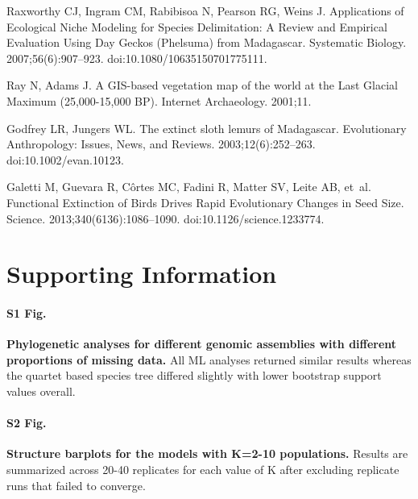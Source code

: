 \documentclass[10pt,letterpaper]{article}
\begin{document}
\begin{thebibliography}{10}
  Raxworthy CJ, Ingram CM, Rabibisoa N, Pearson RG, Weins J.
  \newblock Applications of {Ecological} {Niche} {Modeling} for {Species}
  {Delimitation}: {A} {Review} and {Empirical} {Evaluation} {Using} {Day}
  {Geckos} ({Phelsuma}) from {Madagascar}.
  \newblock Systematic Biology. 2007;56(6):907--923.
  \newblock doi:{10.1080/10635150701775111}.
  

  Ray N, Adams J.
  \newblock A {GIS}-based vegetation map of the world at the {Last} {Glacial} {Maximum} (25,000-15,000 {BP}).
  \newblock Internet Archaeology. 2001;11.

  Godfrey LR, Jungers WL.
  \newblock The extinct sloth lemurs of {Madagascar}.
  \newblock Evolutionary Anthropology: Issues, News, and Reviews.
  2003;12(6):252--263.
  \newblock doi:{10.1002/evan.10123}.
  

  Galetti M, Guevara R, Côrtes MC, Fadini R, Matter SV, Leite AB, et~al.
  \newblock Functional {Extinction} of {Birds} {Drives} {Rapid} {Evolutionary}
  {Changes} in {Seed} {Size}.
  \newblock Science. 2013;340(6136):1086--1090.
  \newblock doi:{10.1126/science.1233774}.
  

\end{thebibliography}


\section*{Supporting Information}

\paragraph*{S1 Fig.}
\label{suppfig:1}
{\bf Phylogenetic analyses for different genomic assemblies with different proportions of missing data.}
All ML analyses returned similar results whereas the quartet based species tree differed slightly
with lower bootstrap support values overall.

\paragraph*{S2 Fig.}
\label{suppfig:2}
{\bf Structure barplots for the models with K=2-10 populations.}
Results are summarized across 20-40 replicates for each value of K after excluding replicate
runs that failed to converge.
\end{document}

